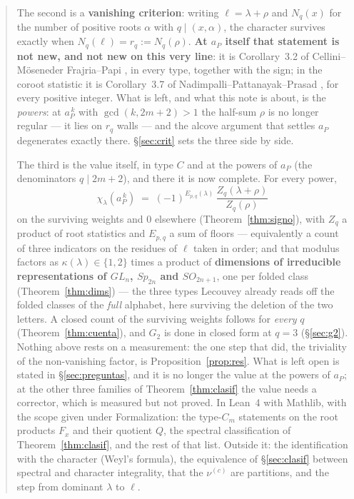 \documentclass[11pt,a4paper]{article}
\theoremstyle{definition}
\begin{document}
\begin{abstract}
\smallskip
\noindent The second is a \textbf{vanishing criterion}: writing $\ell=\lambda+\rho$ and $N_q(x)$ for
the number of positive roots $\alpha$ with $q\mid(x,\alpha)$, the character survives exactly when
$N_q(\ell)=r_q:=N_q(\rho)$. \textbf{At $a_P$ itself that statement is not new, and not new on this
very line}: it is Corollary~3.2 of Cellini--M\"oseneder Frajria--Papi \cite{CMP06}, in every type,
together with the sign; in the coroot statistic it is Corollary~3.7 of
Nadimpalli--Pattanayak--Prasad \cite{NPP25}, for every positive integer. What is left, and what
this note is about, is the \emph{powers}: at $a_P^{\,k}$ with $\gcd(k,2m+2)>1$ the half-sum $\rho$
is no longer regular --- it lies on $r_q$ walls --- and the alcove argument that settles $a_P$
degenerates exactly there. \S\ref{sec:crit} sets the three side by side.

\smallskip
\noindent The third is the value itself, in type $C$ and at the powers of $a_P$ (the denominators
$q\mid 2m+2$), and there it is now complete. For every power,
\[
\chi_\lambda(a_P^{\,k})\;=\;(-1)^{E_{p,q}(\lambda)}\,\frac{Z_q(\lambda+\rho)}{Z_q(\rho)}
\]
on the surviving weights and $0$ elsewhere (Theorem~\ref{thm:signo}), with $Z_q$ a product of root
statistics and $E_{p,q}$ a sum of floors --- equivalently a count of three indicators on the residues of $\ell$
taken in order; and that modulus factors as $\kappa(\lambda)\in\{1,2\}$ times a product of
\textbf{dimensions of irreducible representations of $GL_n$, $Sp_{2n}$ and $SO_{2n+1}$}, one per
folded class (Theorem~\ref{thm:dims}) --- the three types Lecouvey \cite{Lec07a} already reads off
the folded classes of the \emph{full} alphabet, here surviving the deletion of the two letters. A closed count of the surviving weights follows
for \emph{every} $q$ (Theorem~\ref{thm:cuenta}), and $G_2$ is done in closed form at $q=3$
(\S\ref{sec:g2}). Nothing above rests on a measurement: the one step that did, the triviality of the
non-vanishing factor, is Proposition~\ref{prop:res}. What is left open is stated in
\S\ref{sec:preguntas}, and it is no longer the value at the powers of $a_P$; at the other three
families of Theorem~\ref{thm:clasif} the value needs a corrector, which is measured but not proved.
In Lean~4 with Mathlib, with the scope given under Formalization: the type-$C_m$ statements on the
root products $F_x$ and their quotient $Q$, the spectral classification of
Theorem~\ref{thm:clasif}, and the rest of that list. Outside it: the identification with the
character (Weyl's formula), the equivalence of \S\ref{sec:clasif} between spectral and character
integrality, that the $\nu^{(c)}$ are partitions, and the step from dominant $\lambda$ to $\ell$.
\end{abstract}
\end{document}
